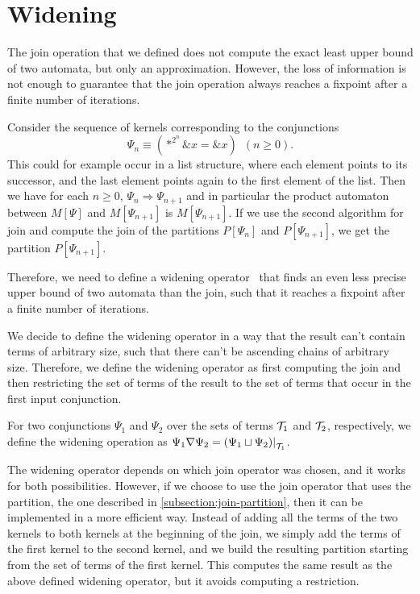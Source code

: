 \section{Widening}

The join operation that we defined does not compute the exact least upper bound of two automata, but only an approximation.
However, the loss of information is not enough to guarantee that the join operation always reaches a fixpoint after a finite number of iterations.

\begin{example}
  Consider the sequence of kernels corresponding to the conjunctions
  \[
    \Psi_n \equiv (*^{2^n} \&x = \&x)\hspace{6pt} (n\geq 0).
  \]
  This could for example occur in a list structure, where each element points to its successor, and the last element points again to the first element of the list.
  Then we have for each $n \geq 0$, $\Psi_n \Longrightarrow \Psi_{n+1}$ and in particular the product automaton between $M[\Psi]$ and $M[\Psi_{n+1}]$ is $M[\Psi_{n+1}]$.
  If we use the second algorithm for join and compute the join of the partitions $P[\Psi_n]$ and $P[\Psi_{n+1}]$, we get the partition $P[\Psi_{n+1}]$.
\end{example}

Therefore, we need to define a widening operator~\cite{widening} that finds an even less precise upper bound of two automata than the join, such that it reaches a fixpoint after a finite number of iterations.

We decide to define the widening operator in a way that the result can't contain terms of arbitrary size, such that there can't be ascending chains of arbitrary size.
Therefore, we define the widening operator as first computing the join and then restricting the set of terms of the result to the set of terms that occur in the first input conjunction.

\begin{definition}
  For two conjunctions $\Psi_1$ and $\Psi_2$ over the sets of terms $\mathcal{T}_1$ and $\mathcal{T}_2$, respectively, we define the widening operation as
  $\Psi_1 \widen \Psi_2 = \restr{(\Psi_1 \join \Psi_2)}{\T_1}$.
\end{definition}

The widening operator depends on which join operator was chosen, and it
works for both possibilities.
However, if we choose to use the join operator that uses the partition, the one described in \cref{subsection:join-partition},
then it can be implemented in a more efficient way.
Instead of adding all the terms of the two kernels to both kernels at the beginning of the join,
we simply add the terms of the first kernel to the second kernel,
and we build the resulting partition starting from the set of terms of the first kernel.
This computes the same result as the above defined widening operator,
but it avoids computing a restriction.

